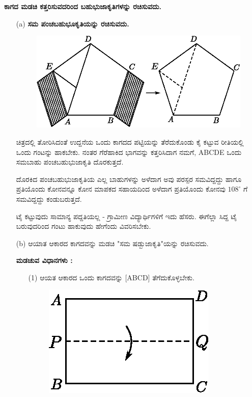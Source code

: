 \medskip
\noindent
\textbf{ಕಾಗದ ಮಡಚಿ ಕತ್ತರಿಸುವದರಿಂದ ಬಹುಭುಜಾಕೃತಿಗಳನ್ನು ರಚಿಸುವದು.}
\begin{itemize}
\item[(a)] \textbf{ಸಮ ಪಂಚಬಹುಭೂಕೃತಿಯನ್ನು ರಚಿಸುವದು.}
\begin{figure}[H]
\centering
\includegraphics[scale=.98]{src/figure/chap1/fig1-16a.eps}
\end{figure}

ಚಿತ್ರದಲ್ಲಿ ತೋರಿಸಿದಂತೆ ಉದ್ದನೆಯ ಒಂದು ಕಾಗದದ ಪಟ್ಟಿಯನ್ನು ತೆರೆದುಕೊಂಡು ಕೈ ಕಟ್ಟುವ ರೀತಿಯಲ್ಲಿ ಒಂದು ಗಂಟನ್ನು ಹಾಕಬೇಕು. ನಂತರ ಗೆರೆಹಾಕಿದ ಭಾಗವನ್ನು ಕತ್ತರಿಸಿದಾಗ ನಮಗೆ,  ABCDE ಒಂದು ಸಮಬಾಹು ಪಂಚಬಹುಭುಜಾಕೃತಿ ದೊರಕುತ್ತದೆ. 

ದೊರಕಿದ ಪಂಚಬಹುಭುಜಾಕೃತಿಯ ಎಲ್ಲ ಬಾಹುಗಳನ್ನು ಅಳೆದಾಗ ಅವು ಪರಸ್ಪರ ಸಮವಿದ್ದದ್ದು ಹಾಗೂ ಪ್ರತಿಯೊಂದು ಕೋನವನ್ನೂ ಕೋನ ಮಾಪಕದ ಸಹಾಯದಿಂದ ಅಳೆದಾಗ ಪ್ರತಿಯೊಂದು ಕೋನವು $108^\circ$ ಗೆ ಸಮವಿದ್ದದ್ದು ಕಂಡುಬರುತ್ತದೆ. 

ಟೈ ಕಟ್ಟುವುದು ಸಾಮಾನ್ಯ ಪದ್ದತಿಯಲ್ಲ - ಗ್ರಾಮೀಣ ವಿದ್ಯಾರ್ಥಿಗಳಿಗೆ ಇದು ಹೆಸರು. ಈಗೆಲ್ಲಾ ಸಿದ್ದ ಟೈ ಬರುವುದರಿಂದ ಗಂಟು ಹಾಕುವುದು ಹೇಗೆಂದು ವಿವರಿಸಬೇಕು. 

\item[(b)] ಆಯಾತ ಆಕಾರದ ಕಾಗದವನ್ನು ಮಡಚಿ "ಸಮ ಷಡ್ಬುಜಾಕೃತಿ"ಯನ್ನು ರಚಿಸುವದು. 

\medskip
\noindent
\textbf{ಮಡಚುವ ವಿಧಾನಗಳು : }

\begin{enumerate}
\item[(1)] ಆಯತ ಆಕಾರದ ಒಂದು ಕಾಗದವನ್ನು [ABCD] ತೆಗೆದುಕೊಳ್ಳಬೇಕು.
\begin{figure}[H]
\centering
\includegraphics[scale=.98]{src/figure/chap1/fig1-16b1.eps}
\end{figure}


\end{enumerate}
\end{itemize}
